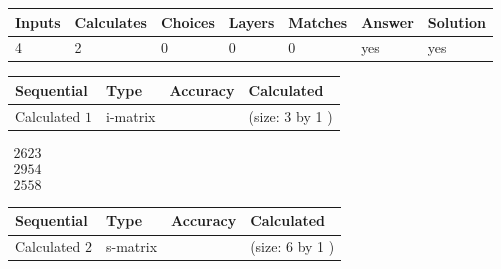 \documentclass[12pt]{article}
\begin{document}
 
 
\noindent{}
 
 

 
 
 
\noindent{}
 
 

 
 
\noindent{}
 
 

 
\vspace{0.3in}
   
   
   
   
\noindent\begin{tabular}{|l|l|l|l|l|l|l|}
 \hline
Inputs & Calculates & Choices & Layers & Matches & Answer & Solution \\ \hline
 4  & 
 2  & 
 0
  & 
 0  & 
 0  & 
  yes & 
  yes 
  \\ \hline
 \end{tabular}
   
   
   
   
\noindent{}
   
   
  
  
\noindent\begin{tabular}{|l|l|l|l|}
\hline
 Sequential & Type & Accuracy & Calculated \\ 
\hline
 
 
  Calculated $  1 $ & i-matrix &  & 
 (size:  3  by  1 )
 \\  \hline  
 \end{tabular}
   
   
$\begin{array}{
 c
 }
 2623  \\ 
 2954  \\ 
 2558
 \end{array}  $ 
  
  
\noindent\begin{tabular}{|l|l|l|l|}
\hline
 Sequential & Type & Accuracy & Calculated \\ 
\hline
 
 
  Calculated $  2 $ & s-matrix & & 
 (size:  6  by  1 )
 \\  \hline  
 \end{tabular}
   
\end{document}
